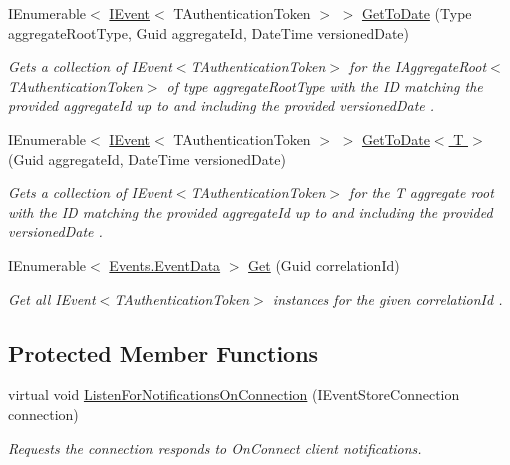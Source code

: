 \begin{DoxyCompactItemize}
I\+Enumerable$<$ \hyperlink{interfaceCqrs_1_1Events_1_1IEvent}{I\+Event}$<$ T\+Authentication\+Token $>$ $>$ \hyperlink{classCqrs_1_1EventStore_1_1EventStore_ac7208e6397e7f9145dfc03b27a2615b8_ac7208e6397e7f9145dfc03b27a2615b8}{Get\+To\+Date} (Type aggregate\+Root\+Type, Guid aggregate\+Id, Date\+Time versioned\+Date)
\begin{DoxyCompactList}\small\item\em Gets a collection of I\+Event$<$\+T\+Authentication\+Token$>$ for the I\+Aggregate\+Root$<$\+T\+Authentication\+Token$>$ of type {\itshape aggregate\+Root\+Type}  with the ID matching the provided {\itshape aggregate\+Id}  up to and including the provided {\itshape versioned\+Date} . \end{DoxyCompactList}\item 
I\+Enumerable$<$ \hyperlink{interfaceCqrs_1_1Events_1_1IEvent}{I\+Event}$<$ T\+Authentication\+Token $>$ $>$ \hyperlink{classCqrs_1_1EventStore_1_1EventStore_aaaa0b3c21d7ad3732af466dda82af5b9_aaaa0b3c21d7ad3732af466dda82af5b9}{Get\+To\+Date$<$ T $>$} (Guid aggregate\+Id, Date\+Time versioned\+Date)
\begin{DoxyCompactList}\small\item\em Gets a collection of I\+Event$<$\+T\+Authentication\+Token$>$ for the {\itshape T} aggregate root with the ID matching the provided {\itshape aggregate\+Id}  up to and including the provided {\itshape versioned\+Date} . \end{DoxyCompactList}\item 
I\+Enumerable$<$ \hyperlink{classCqrs_1_1Events_1_1EventData}{Events.\+Event\+Data} $>$ \hyperlink{classCqrs_1_1EventStore_1_1EventStore_a898b51899af27db8aa0fb0c0dc75b25d_a898b51899af27db8aa0fb0c0dc75b25d}{Get} (Guid correlation\+Id)
\begin{DoxyCompactList}\small\item\em Get all I\+Event$<$\+T\+Authentication\+Token$>$ instances for the given {\itshape correlation\+Id} . \end{DoxyCompactList}\end{DoxyCompactItemize}
\subsection*{Protected Member Functions}
\begin{DoxyCompactItemize}
\item 
virtual void \hyperlink{classCqrs_1_1EventStore_1_1EventStore_add7396a800fe8f64c61406311e8fee1d_add7396a800fe8f64c61406311e8fee1d}{Listen\+For\+Notifications\+On\+Connection} (I\+Event\+Store\+Connection connection)
\begin{DoxyCompactList}\small\item\em Requests the {\itshape connection}  responds to On\+Connect client notifications. \end{DoxyCompactList}\end{DoxyCompactItemize}
